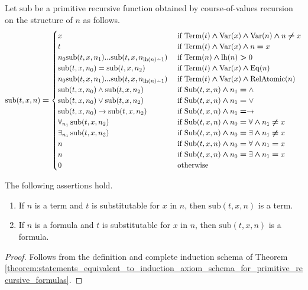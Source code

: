 \documentclass[10pt]{amsart}
\newcommand{\mand}{\boldsymbol{\wedge}}
\newcommand{\mge}{\boldsymbol{>}}
\newcommand{\meq}{\boldsymbol{=}}
\newcommand{\mneq}{\boldsymbol{\neq}}
\begin{document}
\begin{definition}
  Let $\mathrm{sub}$ be a primitive recursive function obtained by course-of-values recursion on the structure of $n$ as follows.
  $$\mathrm{sub}(t,x,n) \meq \begin{cases}
    x&\mbox{ if }\mathrm{Term}(t)\mand \mathrm{Var}(x)\mand \mathrm{Var}(n) \mand n \mneq x\\
    t&\mbox{ if }\mathrm{Term}(t)\mand \mathrm{Var}(x)\mand n \meq x\\
    n_0\mathrm{sub}(t,x,n_1)...\mathrm{sub}(t,x,n_{\mathrm{lh}(n) \dotminus 1}) &\mbox{ if }\mathrm{Term}(n)\mand \mathrm{lh}(n) \mge 0\\
    \mathrm{sub}(t,x,n_0)=\mathrm{sub}(t,x,n_2)&\mbox{ if }\mathrm{Term}(t)\mand \mathrm{Var}(x) \mand \mathrm{Eq}(n)\\
    n_0\mathrm{sub}(t,x,n_1)...\mathrm{sub}(t,x,n_{\mathrm{lh}(n)\dotminus 1})&\mbox{ if }\mathrm{Term}(t)\mand \mathrm{Var}(x) \mand \mathrm{RelAtomic}(n)\\
    \mathrm{sub}(t,x,n_0)\wedge \mathrm{sub}(t,x,n_2)&\mbox{ if }\mathrm{Sub}(t,x,n) \mand n_1 \meq \wedge\\
    \mathrm{sub}(t,x,n_0)\vee \mathrm{sub}(t,x,n_2)&\mbox{ if }\mathrm{Sub}(t,x,n) \mand n_1 \meq \vee\\
    \mathrm{sub}(t,x,n_0)\ra \mathrm{sub}(t,x,n_2)&\mbox{ if }\mathrm{Sub}(t,x,n) \mand n_1 \meq \ra\\
    \forall_{n_1}\,\mathrm{sub}(t,x,n_2)&\mbox{ if }\mathrm{Sub}(t,x,n)\mand n_0 \meq \forall \mand n_1 \mneq x\\
    \exists_{n_1}\,\mathrm{sub}(t,x,n_2)&\mbox{ if }\mathrm{Sub}(t,x,n)\mand n_0 \meq \exists \mand n_1 \mneq x\\
    n&\mbox{ if }\mathrm{Sub}(t,x,n) \mand n_0 \meq \forall \mand n_1 \meq x\\
    n&\mbox{ if }\mathrm{Sub}(t,x,n) \mand n_0 \meq \exists \mand n_1 \meq x\\
    0&\mbox{ otherwise }\\
  \end{cases}$$
\end{definition}

\begin{fact}\label{fact:substitution_in_term_produces_term_and_substititution_in_formula_produces_formula}
  The following assertions hold.
  \begin{enumerate}[label=\emph{\textbf{(\arabic*)}}, leftmargin=3.0em]
    \item If $n$ is a term and $t$ is substitutable for $x$ in $n$, then $\mathrm{sub}(t,x,n)$ is a term.
    \item If $n$ is a formula and $t$ is substitutable for $x$ in $n$, then $\mathrm{sub}(t,x,n)$ is a formula.
  \end{enumerate}
\end{fact}
\begin{proof}
 Follows from the definition and complete induction schema of Theorem \ref{theorem:statements_equivalent_to_induction_axiom_schema_for_primitive_recursive_formulas}.
\end{proof}
\end{document}
